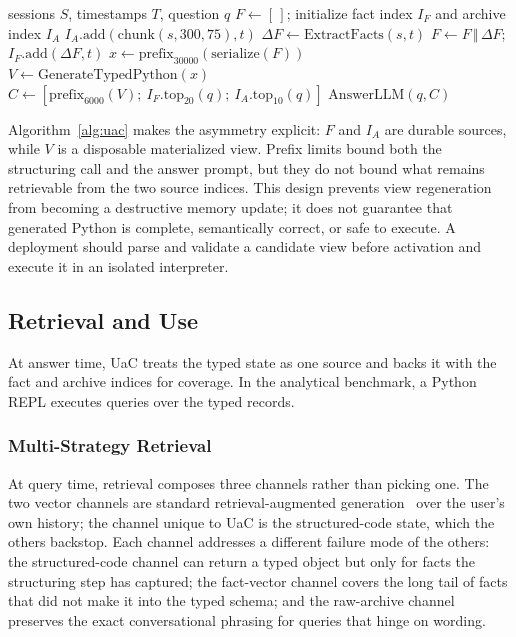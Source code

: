 \begin{algorithm}[t]
\caption{Evaluated UaC update and recall path.}
\label{alg:uac}
\begin{algorithmic}[1]
\REQUIRE sessions $S$, timestamps $T$, question $q$
\STATE $F \gets [\,]$; initialize fact index $I_F$ and archive index $I_A$
  \STATE $I_A.\mathrm{add}(\mathrm{chunk}(s,300,75),t)$
  \STATE $\Delta F \gets \mathrm{ExtractFacts}(s,t)$
  \STATE $F \gets F\,\Vert\,\Delta F$; $I_F.\mathrm{add}(\Delta F,t)$
\ENDFOR
\STATE $x \gets \mathrm{prefix}_{30000}(\mathrm{serialize}(F))$
\STATE $V \gets \mathrm{GenerateTypedPython}(x)$
\STATE $C \gets [\mathrm{prefix}_{6000}(V);\ I_F.\mathrm{top}_{20}(q);\ I_A.\mathrm{top}_{10}(q)]$
\RETURN $\mathrm{AnswerLLM}(q,C)$
\end{algorithmic}
\end{algorithm}

Algorithm~\ref{alg:uac} makes the asymmetry explicit: $F$ and $I_A$ are durable sources, while $V$ is a disposable materialized view. Prefix limits bound both the structuring call and the answer prompt, but they do not bound what remains retrievable from the two source indices. This design prevents view regeneration from becoming a destructive memory update; it does not guarantee that generated Python is complete, semantically correct, or safe to execute. A deployment should parse and validate a candidate view before activation and execute it in an isolated interpreter.

\subsection{Retrieval and Use}
\label{sec:retrieval-use}

At answer time, UaC treats the typed state as one source and backs it with the fact and archive indices for coverage. In the analytical benchmark, a Python REPL executes queries over the typed records.

\subsubsection{Multi-Strategy Retrieval}
\label{sec:retrieval}

At query time, retrieval composes three channels rather than picking one. The two vector channels are standard retrieval-augmented generation~\citep{lewis2020rag} over the user's own history; the channel unique to UaC is the structured-code state, which the others backstop. Each channel addresses a different failure mode of the others: the structured-code channel can return a typed object but only for facts the structuring step has captured; the fact-vector channel covers the long tail of facts that did not make it into the typed schema; and the raw-archive channel preserves the exact conversational phrasing for queries that hinge on wording.

